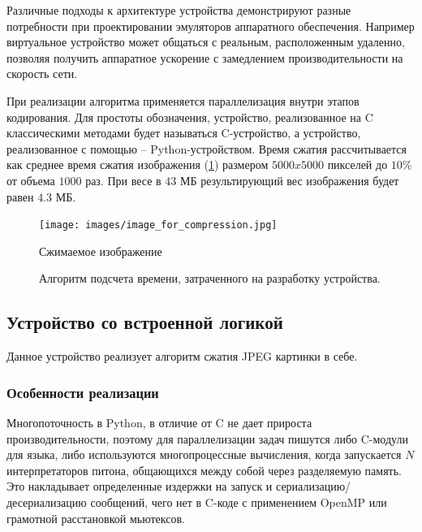Различные подходы к архитектуре устройства демонстрируют
разные потребности при проектировании эмуляторов аппаратного обеспечения.
Например виртуальное устройство может общаться с реальным, расположенным удаленно,
позволяя получить аппаратное ускорение с замедлением производительности на
скорость сети.

При реализации алгоритма применяется параллелизация внутри этапов кодирования.
Для простоты обозначения, устройство, реализованное на C классическими
методами будет называться C-устройство, а устройство, реализованное с помощью {\mylanguage} --
Python-устройством.
Время сжатия рассчитывается как среднее время сжатия изображения (\cref{fig:image-for-compression})
размером $5000x5000$ пикселей до $10\%$ от объема $1000$ раз.
При весе в $43$ МБ результирующий вес изображения будет равен $4.3$ МБ.


\begin{figure}[!htbp]
    \centering
    \begin{adjustbox}{max totalsize={0.8\textwidth}{\textheight}}
        \texttt{[image: images/image\_for\_compression.jpg]}
    \end{adjustbox}
    \caption{Сжимаемое изображение}\label{fig:image-for-compression}
\end{figure}


\begin{figure}[!htbp]
    \centering
    
    \caption{Алгоритм подсчета времени, затраченного на разработку устройства.}\label{fig:git-hours}
\end{figure}

\subsection{Устройство со встроенной логикой}\label{sec:ch3/sec2/sec1}

Данное устройство реализует алгоритм сжатия JPEG картинки в себе.

\subsubsection{Особенности реализации}\label{sec:ch3/sec2/sec1/sec1}

Многопоточность в Python, в отличие от C не дает прироста производительности,
поэтому для параллелизации задач пишутся либо C-модули для языка, либо используются
многопроцессные вычисления, когда запускается $N$ интерпретаторов питона, общающихся
между собой через разделяемую память. Это накладывает определенные издержки на запуск
и сериализацию/десериализацию сообщений, чего нет в C-коде с применением OpenMP или
грамотной расстановкой мьютексов.

